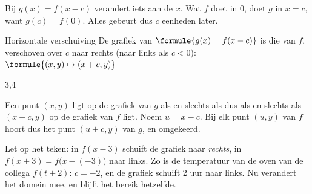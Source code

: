 Bij $g(x) = f(x - c)$ verandert iets aan de $x$. Wat $f$ doet in $0$, doet $g$ in $x = c$, want $g(c) = f(0)$. Alles gebeurt dus $c$ eenheden later.

\begin{theorie}
\begin{stelling}{Horizontale verschuiving}
De grafiek van $\formule{g(x) = f(x - c)}$ is die van $f$, verschoven over $c$ naar rechts (naar links als $c < 0$): \quad $\formule{(x, y) \mapsto (x + c, y)}$
\end{stelling}

\begin{alleenvoor}{3,4}
\begin{bewijs}
Een punt $(x, y)$ ligt op de grafiek van $g$ als en slechts als
dus als en slechts als $(x - c, y)$ op de grafiek van $f$ ligt. Noem $u = x - c$. Bij elk punt $(u, y)$ van $f$ hoort dus het punt $(u + c, y)$ van $g$, en omgekeerd.
\end{bewijs}
\end{alleenvoor}
\end{theorie}

Let op het teken: in $f(x - 3)$ schuift de grafiek naar \textit{rechts}, in $f(x + 3) = f\bigl(x - (-3)\bigr)$ naar links. Zo is de temperatuur van de oven van de collega $f(t + 2)$: $c = -2$, en de grafiek schuift 2 uur naar links. Nu verandert het domein mee, en blijft het bereik hetzelfde.


\begin{oefeningen}
\end{oefeningen}

